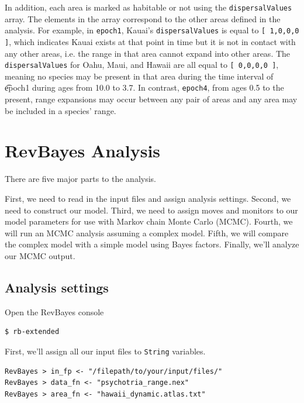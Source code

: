 \documentclass[11pt]{article}
\begin{document}
In addition, each area is marked as habitable or not using the {\tt dispersalValues} array.
The elements in the array correspond to the other areas defined in the analysis.
For example, in {\tt epoch1}, Kauai's {\tt dispersalValues} is equal to {\tt [ 1,0,0,0 ]}, which indicates Kauai exists at that point in time but it is not in contact with any other areas, i.e. the range in that area cannot expand into other areas.
The {\tt dispersalValues} for Oahu, Maui, and Hawaii are all equal to {\tt [ 0,0,0,0 ]}, meaning no species may be present in that area during the time interval of {\t epoch1} during ages from 10.0 to 3.7. In contrast, {\tt epoch4}, from ages 0.5 to the present, range expansions may occur between any pair of areas and any area may be included in a species' range.

\section{RevBayes Analysis}

There are five major parts to the analysis.

First, we need to read in the input files and assign analysis settings.
Second, we need to construct our model.
Third, we need to assign moves and monitors to our model parameters for use with Markov chain Monte Carlo (MCMC).
Fourth, we will run an MCMC analysis assuming a complex model.
Fifth, we will compare the complex model with a simple model using Bayes factors.
Finally, we'll analyze our MCMC output.

\subsection{Analysis settings}

\setlength{\parindent}{0pt}

Open the RevBayes console

\begin{snugshade}
\begin{lstlisting}
$ rb-extended
\end{lstlisting}
\end{snugshade}

First, we'll assign all our input files to {\tt String} variables.
\begin{snugshade}
\begin{lstlisting}
RevBayes > in_fp <- "/filepath/to/your/input/files/"
RevBayes > data_fn <- "psychotria_range.nex"
RevBayes > area_fn <- "hawaii_dynamic.atlas.txt"
\end{lstlisting}
\end{snugshade}
\end{document}
